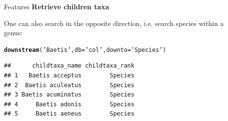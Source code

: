 \documentclass[final,t]{beamer}\usepackage[]{graphicx}\usepackage[]{color}
\makeatletter
\newcommand{\hlstr}[1]{\textcolor[rgb]{0.192,0.494,0.8}{#1}}%
\newcommand{\hlstd}[1]{\textcolor[rgb]{0.345,0.345,0.345}{#1}}%
\newcommand{\hlkwc}[1]{\textcolor[rgb]{0.333,0.667,0.333}{#1}}%
\newcommand{\hlkwd}[1]{\textcolor[rgb]{0.737,0.353,0.396}{\textbf{#1}}}%
\newenvironment{kframe}{%
 \def\at@end@of@kframe{}%
 \ifinner\ifhmode%
  \def\at@end@of@kframe{\end{minipage}}%
  \begin{minipage}{\columnwidth}%
 \fi\fi%
 \def\FrameCommand##1{\hskip\@totalleftmargin \hskip-\fboxsep
 \colorbox{shadecolor}{##1}\hskip-\fboxsep
     \hskip-\linewidth \hskip-\@totalleftmargin \hskip\columnwidth}%
 \MakeFramed {\advance\hsize-\width
   \@totalleftmargin\z@ \linewidth\hsize
   \@setminipage}}%
 {\par\unskip\endMakeFramed%
 \at@end@of@kframe}
\newenvironment{knitrout}{}{} %
\renewenvironment{knitrout}{}{\vspace{-1.8em}}
\makeatother
\begin{document}
\begin{frame}[fragile]
\begin{columns}[t]
\begin{column}{.49\linewidth}
\begin{block}{Features}
\textcolor{i6bluedark}{\textbf{\large Retrieve children taxa}}
        \vspace{0.5em}
        \par
        \begingroup
        \leftskip=2cm
        \noindent 
          One can also search in the opposite direction, i.e. search species within a genus:
        \par
        \endgroup
\begin{knitrout}\footnotesize
{}\color{fgcolor}\begin{kframe}
\begin{alltt}
\hlkwd{downstream}\hlstd{(}\hlstr{'Baetis'}\hlstd{,} \hlkwc{db} \hlstd{=} \hlstr{'col'}\hlstd{,} \hlkwc{downto} \hlstd{=} \hlstr{'Species'}\hlstd{)}
\end{alltt}
\end{kframe}
\end{knitrout}
\begin{knitrout}\footnotesize
{}\color{fgcolor}\begin{kframe}
\begin{verbatim}
##      childtaxa_name childtaxa_rank
## 1   Baetis acceptus        Species
## 2  Baetis aculeatus        Species
## 3 Baetis acuminatus        Species
## 4     Baetis adonis        Species
## 5     Baetis aeneus        Species
\end{verbatim}
\end{kframe}
\end{knitrout}
\vspace{2em}

			\end{block}
		\end{column}
    
		\begin{column}{0.005\linewidth}
		\end{column}



		\begin{column}{.49\linewidth}
			\vspace{-\baselineskip}
      

\end{column}
\end{columns}
\end{frame}
\end{document}
